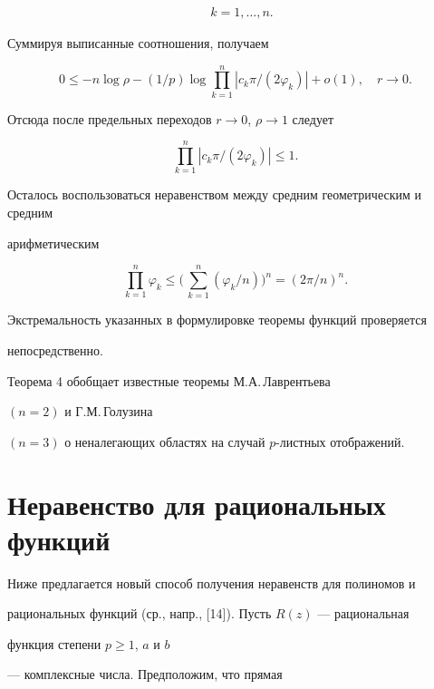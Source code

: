 \begin{pf}
\begin{multline*}
\quad k=1,\dotsc,n.


\end{multline*}


Суммируя выписанные соотношения, получаем


$$


0\leq-n\log \rho-(1/p)\log\prod\limits_{k=1}^{n}|c_k\pi/(2\varphi_k)|+o(1),


\quad r\to 0.


$$


Отсюда после предельных переходов $r\to 0$, $\rho\to 1$ следует


$$


\prod\limits_{k=1}^{n}|c_k\pi/(2\varphi_k)|\leq 1.


$$


Осталось воспользоваться неравенством между средним геометрическим и средним


арифметическим


$$


\prod\limits_{k=1}^{n}\varphi_k\leq


\bigg(\,\sum\limits_{k=1}^{n}(\varphi_k/n)\bigg)^n=(2\pi/n)^n.


$$


Экстремальность указанных в формулировке теоремы функций проверяется


непосредственно.


\end{pf}





Теорема 4 обобщает известные теоремы М.А.\,Лаврентьева


$(n=2)$ и Г.М.\,Голузина


$(n=3)$ о неналегающих областях на случай $p$-листных отображений.





\section{Неравенство для рациональных функций}





Ниже предлагается новый способ получения неравенств для полиномов и


рациональных функций (ср., напр., [14]). Пусть $R(z)$ --- рациональная


функция степени $p\geq 1$, $a$ и $b$


--- комплексные числа. Предположим, что прямая


